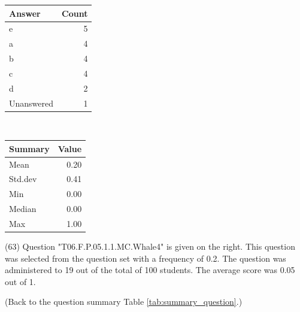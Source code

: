 \documentclass[12pt,nohyper]{tufte-handout}\usepackage[]{graphicx}\usepackage[]{color}
\begin{document}
\begin{center}%
\begin{tabular}{lr}
  \hline
Answer & Count \\ 
  \hline
e &   5 \\ 
  a &   4 \\ 
  b &   4 \\ 
  c &   4 \\ 
  d &   2 \\ 
  Unanswered &   1 \\ 
   \hline
\end{tabular}
~~~~~~~~%
\begin{tabular}{lr}
  \hline
Summary & Value \\ 
  \hline
Mean & 0.20 \\ 
  Std.dev & 0.41 \\ 
  Min & 0.00 \\ 
  Median & 0.00 \\ 
  Max & 1.00 \\ 
   \hline
\end{tabular}
\end{center}\newpage{} (63) Question "T06.F.P.05.1.1.MC.Whale4" is given on the right. This question was selected from the question set with a frequency of 0.2. The question was administered to 19 out of the total of 100 students. The average score was 0.05 out of 1.

 (Back to the question summary Table \ref{tab:summary_question}.)
\end{document}
